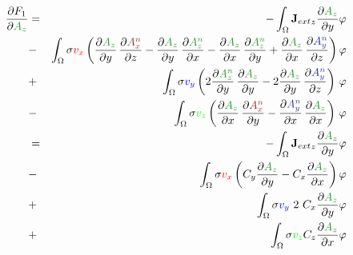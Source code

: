 \documentclass[smallextended]{svjour3}       %
\begin{document}
			\begin{eqnarray}
			\frac{\partial F_1}{\partial \textcolor{darkgre}{A_z}} & = &
			-\int_{\Omega} {\mathbf{J}_{ext}}_z \frac{\partial \textcolor{darkgre}{A_z}}{\partial y} \varphi				
			\nonumber \\
			& - & \int_{\Omega} \sigma \textcolor{red}{v_x} \left(\frac{\partial \textcolor{darkgre}{A_z}}{\partial y}\,\frac{\partial \textcolor{darkred}{A_x^n}}{\partial z} - \frac{\partial \textcolor{darkgre}{A_z}}{\partial y}\,\frac{\partial \textcolor{darkgre}{A_z^n}}{\partial x} - \frac{\partial \textcolor{darkgre}{A_z}}{\partial x}\,\frac{\partial \textcolor{darkgre}{A_z^n}}{\partial y} + \frac{\partial \textcolor{darkgre}{A_z}}{\partial x}\,\frac{\partial \textcolor{darkblu}{A_y^n}}{\partial z} \right) \varphi \nonumber \\			
			& + & \int_{\Omega} \sigma \textcolor{blu}{v_y} \left( 2 \frac{\partial \textcolor{darkgre}{A_z^n}}{\partial y}\,\frac{\partial \textcolor{darkgre}{A_z}}{\partial y} - 2 \frac{\partial \textcolor{darkgre}{A_z}}{\partial y}\,\frac{\partial \textcolor{darkblu}{A_y^n}}{\partial z} \right)\, \varphi \nonumber \\			
			& - & \int_{\Omega} \sigma \textcolor{gre}{v_z} \left(\frac{\partial \textcolor{darkgre}{A_z}}{\partial x}\,\frac{\partial \textcolor{darkred}{A_x^n}}{\partial y} - \frac{\partial \textcolor{darkblu}{A_y^n}}{\partial x}\,\frac{\partial \textcolor{darkgre}{A_z}}{\partial x} \right)\, \varphi\\
			 & = &
			-\int_{\Omega} {\mathbf{J}_{ext}}_z \frac{\partial \textcolor{darkgre}{A_z}}{\partial y} \varphi	
			\nonumber \\
			& - &\int_{\Omega} \sigma  \textcolor{red}{v_x}    \left(C_y \frac{\partial \textcolor{darkgre}{A_z}}{\partial y} - C_x \frac{\partial \textcolor{darkgre}{A_z}}{\partial x}\right) \varphi \nonumber \\			
			& + & \int_{\Omega} \sigma \textcolor{blu}{v_y}\ 2\ C_x \frac{\partial \textcolor{darkgre}{A_z}}{\partial y} \varphi \nonumber \\			
			& + & \int_{\Omega} \sigma \textcolor{gre}{v_z} C_z \frac{\partial \textcolor{darkgre}{A_z}}{\partial x} \varphi
		\end{eqnarray}
		
\end{document}
